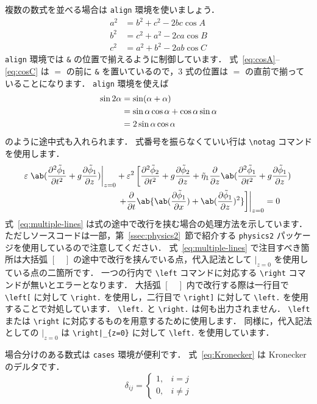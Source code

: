 複数の数式を並べる場合は \verb|align| 環境を使いましょう．
\begin{align}
    a^2 &= b^2 + c^2 - 2bc\cos A \label{eq:cosA} \\
    b^2 &= c^2 + a^2 - 2ca\cos B \label{eq:cosB} \\
    c^2 &= a^2 + b^2 - 2ab\cos C \label{eq:cosC}
\end{align}
\verb|align| 環境では \verb|&| の位置で揃えるように制御しています．
式~\eqref{eq:cosA}--\eqref{eq:cosC} は $=$ の前に \verb|&| を置いているので，3 式の位置は $=$ の直前で揃っていることになります．
\verb|align| 環境を使えば
\begin{align}
    \sin 2\alpha &= \sin(\alpha + \alpha) \notag \\
    &= \sin\alpha\cos\alpha + \cos\alpha\sin\alpha \notag \\
    &= 2\sin\alpha\cos\alpha
    \label{eq:double-sin}
\end{align}
のように途中式も入れられます．
式番号を振らなくていい行は \verb|\notag| コマンドを使用します．
\begin{align}
    \varepsilon\left.\ab(\pdv[order=2]{\tilde{\phi}_1}{t} + g\pdv{\tilde{\phi}_1}{z})\right|_{z=0} &+ \varepsilon^2\left[\pdv[order=2]{\tilde{\phi}_2}{t} + g\pdv{\tilde{\phi}_2}{z} + \tilde{\eta}_1\pdv{}{z}\ab(\pdv[order=2]{\tilde{\phi}_1}{t} + g\pdv{\tilde{\phi}_1}{z})\right. \notag \\
    &\left.\left.+ \pdv{}{t}\ab\{\ab(\pdv{\tilde{\phi}_1}{x}) + \ab(\pdv{\tilde{\phi}_1}{z})^2\}\right]\right|_{z=0} = 0
    \label{eq:multiple-lines}
\end{align}
式~\eqref{eq:multiple-lines} は式の途中で改行を挟む場合の処理方法を示しています．
ただしソースコードは一部，第~\ref{ssec:physics2}~節で紹介する \verb|physics2| パッケージを使用しているので注意してください．
式~\eqref{eq:multiple-lines} で注目すべき箇所は大括弧 $[\quad]$ の途中で改行を挟んでいる点，代入記法として $|_{z=0}$ を使用している点の二箇所です．
一つの行内で \verb|\left| コマンドに対応する \verb|\right| コマンドが無いとエラーとなります．
大括弧 $[\quad]$ 内で改行する際は一行目で \verb|\left[| に対して \verb|\right.| を使用し，二行目で \verb|\right]| に対して \verb|\left.| を使用することで対処しています．
\verb|\left.| と \verb|\right.| は何も出力されません．
\verb|\left| または \verb|\right| に対応するものを用意するために使用します．
同様に，代入記法としての $|_{z=0}$ は \verb"\right|_{z=0}" に対して \verb|\left.| を使用しています．

場合分けのある数式は \verb|cases| 環境が便利です．
式~\eqref{eq:Kronecker} は Kronecker のデルタです．
\begin{equation}
    \delta_{ij} = 
    \begin{cases}
        1, & i = j \\
        0, & i \neq j
    \end{cases}
    \label{eq:Kronecker}
\end{equation}

